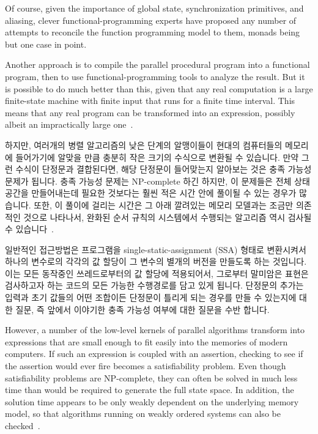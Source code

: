 Of course, given the importance of global state, synchronization
primitives, and aliasing, clever functional-programming experts have
proposed any number of attempts to reconcile the function programming
model to them, monads being but one case in point.

Another approach is to compile the parallel procedural program into
a functional program, then to use functional-programming tools to analyze
the result.
But it is possible to do much better than this, given that any real
computation is a large finite-state machine with finite input that
runs for a finite time interval.
This means that any real program can be transformed into an expression,
possibly albeit an impractically large one~\cite{VijayDSilva2012-sas}.
\fi

하지만, 여러개의 병렬 알고리즘의 낮은 단계의 알맹이들이 현대의 컴퓨터들의
메모리에 들어가기에 알맞을 만큼 충분히 작은 크기의 수식으로 변환될 수 있습니다.
만약 그런 수식이 단정문과 결합된다면, 해당 단정문이 들어맞는지 알아보는 것은
충족 가능성 문제가 됩니다.
충족 가능성 문제는 NP-complete 하긴 하지만, 이 문제들은 전체 상태 공간을
만들어내는데 필요한 것보다는 훨씬 적은 시간 안에 풀이될 수 있는 경우가
많습니다.
또한, 이 풀이에 걸리는 시간은 그 아래 깔려있는 메모리 모델과는 조금만 의존적인
것으로 나타나서, 완화된 순서 규칙의 시스템에서 수행되는 알고리즘 역시 검사될 수
있습니다~\cite{JadeAlglave2013-cav}.

일반적인 접근방법은 프로그램을 single-static-assignment (SSA) 형태로 변환시켜서
하나의 변수로의 각각의 값 할당이 그 변수의 별개의 버전을 만들도록 하는
것입니다.
이는 모든 동작중인 쓰레드로부터의 값 할당에 적용되어서, 그로부터 말미암은
표현은 검사하고자 하는 코드의 모든 가능한 수행경로를 담고 있게 됩니다.
단정문의 추가는 입력과 초기 값들의 어떤 조합이든 단정문이 틀리게 되는 경우를
만들 수 있는지에 대한 질문, 즉 앞에서 이야기한 충족 가능성 여부에 대한 질문을
수반 합니다.
\iffalse

However, a number of the low-level kernels of parallel algorithms transform
into expressions that are small enough to fit easily into the memories
of modern computers.
If such an expression is coupled with an assertion, checking to see if
the assertion would ever fire becomes a satisfiability problem.
Even though satisfiability problems are NP-complete, they can often
be solved in much less time than would be required to generate the
full state space.
In addition, the solution time appears to be only weakly dependent on
the underlying memory model, so that algorithms running on weakly ordered
systems can also be checked~\cite{JadeAlglave2013-cav}.

